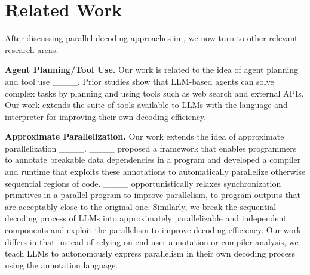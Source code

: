 \section{Related Work}
After discussing parallel decoding approaches in , we now turn to other relevant research areas.




\textbf{Agent Planning/Tool Use.}
Our work is related to the idea of agent planning and tool use ____.
Prior studies show that LLM-based agents can solve complex tasks by planning and using tools such as web search and external APIs.
Our work extends the suite of tools available to LLMs with the \lang{} language and interpreter for improving their own decoding efficiency.

\textbf{Approximate Parallelization.}
Our work extends the idea of approximate parallelization ____.
____ proposed a framework that enables programmers to annotate breakable data dependencies in a program and 
developed a compiler and runtime that exploits these annotations to automatically parallelize otherwise sequential regions of code.
____ opportunistically relaxes synchronization primitives in a parallel program to improve parallelism, to program outputs that are acceptably close to the original one.
Similarly, we break the sequential decoding process of LLMs into approximately parallelizable and independent components and exploit the parallelism to improve decoding efficiency.
Our work differs in that instead of relying on end-user annotation or compiler analysis, we teach LLMs to autonomously express parallelism in their own decoding process using the \lang{} annotation language.


\vspace{-.5em}